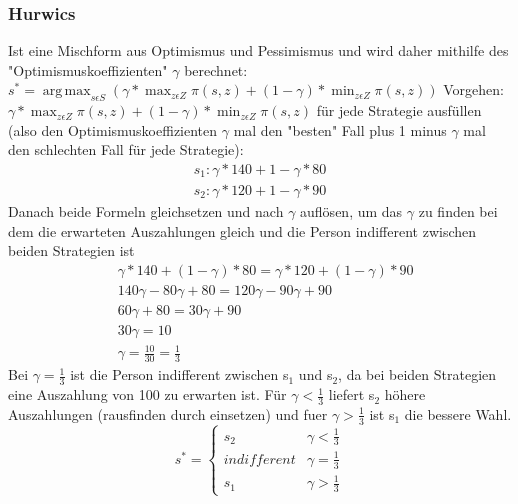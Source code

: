 \documentclass[11pt]{article}
\DeclareMathOperator*{\argmax}{arg\,max}
\begin{document}
\subsubsection{Hurwics}
\label{sec:org40a15ce}
Ist eine Mischform aus Optimismus und Pessimismus und wird daher mithilfe des "Optimismuskoeffizienten" \(\gamma\) berechnet:\\
\(\displaystyle s^* = \argmax_{s \epsilon S}(\gamma * \max_{z \epsilon Z} \pi(s,z) + (1 - \gamma) * \min_{z \epsilon Z} \pi(s,z))\)
\newline
Vorgehen: 
\(\displaystyle \gamma * \max_{z \epsilon Z} \pi(s,z) + (1 - \gamma) * \min_{z \epsilon Z} \pi(s,z)\) für jede Strategie ausfüllen (also den Optimismuskoeffizienten \(\gamma\) mal den "besten" Fall plus 1 minus \(\gamma\) mal den schlechten Fall für jede Strategie):\\
\begin{equation*}
\begin{aligned}
s_1: \gamma * 140 + 1 - \gamma * 80\\
s_2: \gamma * 120 + 1 - \gamma * 90
\end{aligned}
\end{equation*}
Danach beide Formeln gleichsetzen und nach \(\gamma\) auflösen, um das \(\gamma\) zu finden bei dem die erwarteten Auszahlungen gleich und die Person indifferent zwischen beiden Strategien ist
\begin{equation*}
\begin{aligned}
&\gamma * 140 + (1 - \gamma) * 80 = \gamma * 120 + (1 - \gamma) * 90\\
&140\gamma - 80\gamma + 80 = 120\gamma - 90\gamma + 90\\
&60\gamma + 80 = 30\gamma + 90\\
&30\gamma = 10\\
&\gamma = \frac{10}{30} = \frac{1}{3}
\end{aligned}
\end{equation*}
Bei \(\gamma=\frac{1}{3}\) ist die Person indifferent zwischen s\(_{\text{1}}\) und s\(_{\text{2}}\), da bei beiden Strategien eine Auszahlung von 100 zu erwarten ist. Für \(\gamma<\frac{1}{3}\) liefert s\(_{\text{2}}\) höhere Auszahlungen (rausfinden durch einsetzen) und fuer \(\gamma>\frac{1}{3}\) ist s\(_{\text{1}}\) die bessere Wahl.\\
\[ s^* =\begin{cases} 
      s_2 & \gamma < \frac{1}{3} \\
      indifferent & \gamma=\frac{1}{3} \\
      s_1 & \gamma > \frac{1}{3}
   \end{cases}
\]
\end{document}
